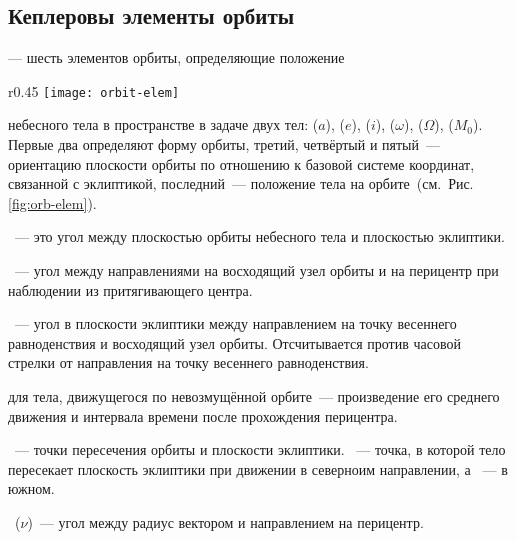 \subsection{Кеплеровы элементы орбиты}

 --- шесть элементов орбиты, определяющие положение
\begin{wrapfigure}[14]{r}{0.45\tw}
	\centering
	\vspace{-1pc}
	\texttt{[image: orbit-elem]}
	\label{fig:orb-elem}
\end{wrapfigure}
небесного тела в пространстве в задаче двух тел:  ($a$),  ($e$),  ($i$),  ($\omega$),  ($\Omega$),  ($M_0$). Первые два определяют форму орбиты, третий, четвёртый и пятый~--- ориентацию плоскости орбиты по отношению к базовой системе координат, связанной с эклиптикой, последний~--- положение тела на орбите~(см.~Рис.\,\ref{fig:orb-elem}).

~--- это угол между плоскостью орбиты небесного тела и плоскостью эклиптики.

~--- угол между направлениями на восходящий узел орбиты и на перицентр при наблюдении из притягивающего центра.

~--- угол в плоскости эклиптики между направлением на точку весеннего равноденствия и восходящий узел орбиты. Отсчитывается против часовой стрелки от направления на точку весеннего равноденствия.

 для тела, движущегося по невозмущённой орбите~--- произведение его среднего движения и интервала времени после прохождения перицентра.

~--- точки пересечения орбиты и плоскости эклиптики. ~--- точка, в которой тело пересекает плоскость эклиптики при движении в северноим направлении, а ~--- в южном.

~($\nu$)~--- угол между радиус вектором и направлением на перицентр.